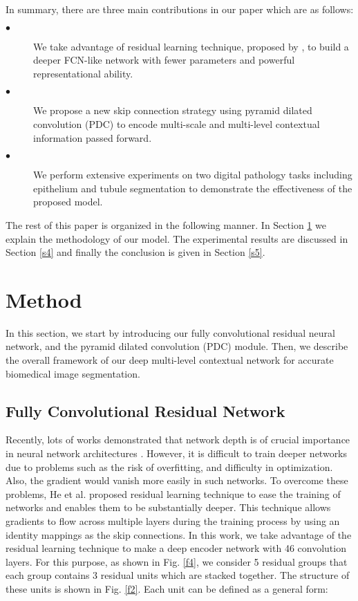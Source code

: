 \documentclass[10pt,twocolumn]{article}
\begin{document}
In summary, there are three main contributions in our paper which are
as follows:

\begin{description}
\item[$\bullet$] We take advantage of residual learning technique, proposed by \cite{r9}, to build a deeper FCN-like network with fewer parameters and powerful representational ability.
\item[$\bullet$] 
We propose a new skip connection strategy using pyramid dilated convolution (PDC) to encode multi-scale and multi-level contextual information passed forward.


\item[$\bullet$] We perform extensive experiments on two digital pathology tasks including epithelium and tubule segmentation \cite{r6} to demonstrate the effectiveness of the proposed model.

\end{description}

The rest of this paper is organized in the following manner. In Section \ref{s3} we explain the methodology of our model. The experimental results are discussed in Section \ref{s4} and finally the conclusion is given in Section \ref{s5}.



\section{Method}\label{s3}
In this section, we start by introducing our fully convolutional residual neural
network, and the pyramid dilated convolution (PDC) module. Then, we describe the overall framework of our deep multi-level contextual network for accurate biomedical image segmentation. 
\subsection{Fully Convolutional Residual Network}
\label{s31}
Recently, lots of works demonstrated that network depth is of crucial importance in neural network architectures \cite{r11}. However, it is difficult to train deeper networks due to problems such as the risk of overfitting, and difficulty in optimization. Also, the gradient would vanish more easily in such networks. To overcome these problems, He et al. \cite{r9} proposed residual learning technique to ease the training of networks and enables them to be substantially deeper. This technique allows gradients to flow across multiple layers during the training process by using an identity mappings as the skip connections. In this work, we take advantage of the residual learning technique to make a deep encoder network with 46 convolution layers. For this purpose, as shown in Fig. \ref{f4},  we consider 5 residual groups that each group contains 3 residual units which are stacked together. The structure of these units is shown in Fig. \ref{f2}. Each unit can be defined as a general form:
\end{document}
